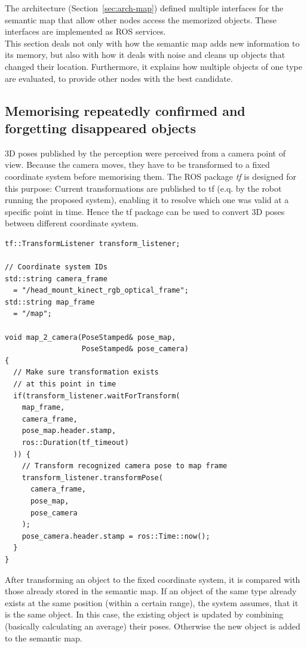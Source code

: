 The architecture (Section~\ref{sec:arch-map}) defined multiple interfaces for the semantic map that allow other nodes access the memorized objects. These interfaces are implemented as ROS services. \\

This section deals not only with how the semantic map adds new information to its memory, but also with how it deals with noise and cleans up objects that changed their location. Furthermore, it explains how multiple objects of one type are evaluated, to provide other nodes with the best candidate.

\subsection{Memorising repeatedly confirmed and forgetting disappeared objects}
\label{sec:impl-memo}
3D poses published by the perception were perceived from a camera point of view. Because the camera moves, they have to be transformed to a fixed coordinate system before memorising them. The ROS package \textit{tf} is designed for this purpose: Current transformations are published to tf (e.q. by the robot running the proposed system), enabling it to resolve which one was valid at a specific point in time. Hence the tf package can be used to convert 3D poses between different coordinate system.

\begin{lstlisting}[caption=An example that shows how to use tf to transform a pose from one coordinate system to another.]
tf::TransformListener transform_listener;

// Coordinate system IDs
std::string camera_frame
  = "/head_mount_kinect_rgb_optical_frame";
std::string map_frame
  = "/map";

void map_2_camera(PoseStamped& pose_map,
                  PoseStamped& pose_camera)
{
  // Make sure transformation exists
  // at this point in time
  if(transform_listener.waitForTransform(
    map_frame,
    camera_frame,
    pose_map.header.stamp,
    ros::Duration(tf_timeout)
  )) {
    // Transform recognized camera pose to map frame
    transform_listener.transformPose(
      camera_frame,
      pose_map,
      pose_camera
    );
    pose_camera.header.stamp = ros::Time::now();
  }
}
\end{lstlisting}

After transforming an object to the fixed coordinate system, it is compared with those already stored in the semantic map. If an object of the same type already exists at the same position (within a certain range), the system assumes, that it is the same object. In this case, the existing object is updated by combining (basically calculating an average) their poses. Otherwise the new object is added to the semantic map.

